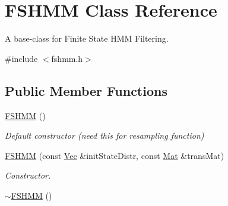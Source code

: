 \hypertarget{classFSHMM}{}\section{F\+S\+H\+MM Class Reference}
\label{classFSHMM}


A base-\/class for Finite State H\+MM Filtering.  




{\ttfamily \#include $<$fshmm.\+h$>$}

\subsection*{Public Member Functions}
\begin{DoxyCompactItemize}
\item 
\hyperlink{classFSHMM_a7d9109a5f787b3842f84257b79791cb9}{F\+S\+H\+MM} ()
\begin{DoxyCompactList}\small\item\em Default constructor (need this for resampling function) \end{DoxyCompactList}\item 
\hyperlink{classFSHMM_a644606d0cb00e2e0779fe8dcf53e2a42}{F\+S\+H\+MM} (const \hyperlink{apf__filter_8h_a4c7df05c6f5e8a0d15ae14bcdbc07152}{Vec} \&init\+State\+Distr, const \hyperlink{apf__filter_8h_ae601f56a556993079f730483c574356f}{Mat} \&trans\+Mat)
\begin{DoxyCompactList}\small\item\em Constructor. \end{DoxyCompactList}\item 
\hyperlink{classFSHMM_a0d011b77cf9541a312fffa43d24fa41f}{$\sim$\+F\+S\+H\+MM} ()\hypertarget{classFSHMM_a0d011b77cf9541a312fffa43d24fa41f}{}\label{classFSHMM_a0d011b77cf9541a312fffa43d24fa41f}


\end{DoxyCompactItemize}
